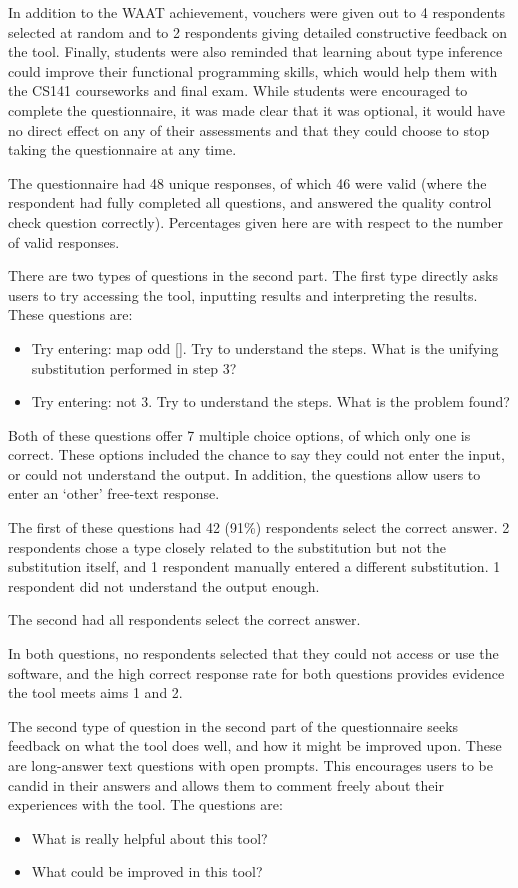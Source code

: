 \documentclass[a4paper,fleqn,12pt]{article}
\begin{document}
In addition to the WAAT achievement, vouchers were given out to 4 respondents selected at random and to 2 respondents giving detailed constructive feedback on the tool. Finally, students were also reminded that learning about type inference could improve their functional programming skills, which would help them with the CS141 courseworks and final exam. While students were encouraged to complete the questionnaire, it was made clear that it was optional, it would have no direct effect on any of their assessments and that they could choose to stop taking the questionnaire at any time.

The questionnaire had 48 unique responses, of which 46 were valid (where the respondent had fully completed all questions, and answered the quality control check question correctly). Percentages given here are with respect to the number of valid responses.

There are two types of questions in the second part. The first type directly asks users to try accessing the tool, inputting results and interpreting the results. These questions are:
\begin{itemize}
  \item Try entering: map odd []. Try to understand the steps. What is the unifying substitution performed in step 3?
  \item Try entering: not 3. Try to understand the steps. What is the problem found?
\end{itemize}
Both of these questions offer 7 multiple choice options, of which only one is correct. These options included the chance to say they could not enter the input, or could not understand the output. In addition, the questions allow users to enter an ‘other’ free-text response.

The first of these questions had 42 (91\%) respondents select the correct answer. 2 respondents chose a type closely related to the substitution but not the substitution itself, and 1 respondent manually entered a different substitution. 1 respondent did not understand the output enough.

The second had all respondents select the correct answer.

In both questions, no respondents selected that they could not access or use the software, and the high correct response rate for both questions provides evidence the tool meets aims 1 and 2.

The second type of question in the second part of the questionnaire seeks feedback on what the tool does well, and how it might be improved upon. These are long-answer text questions with open prompts. This encourages users to be candid in their answers and allows them to comment freely about their experiences with the tool. The questions are:
\begin{itemize}
  \item What is really helpful about this tool?
  \item What could be improved in this tool?
\end{itemize}
\end{document}
